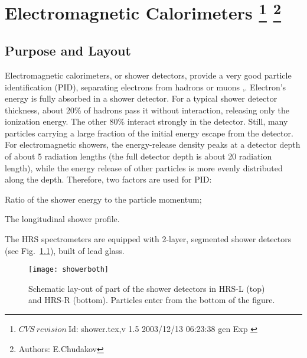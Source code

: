 \chapter[Electromagnetic Calorimeters]{Electromagnetic Calorimeters
\footnote{
  $CVS~revision~ $Id: shower.tex,v 1.5 2003/12/13 06:23:38 gen Exp $ $
}
\footnote{Authors: E.Chudakov }
}

\section{Purpose and Layout}

Electromagnetic calorimeters, or shower detectors, provide a very good
particle identification (PID), separating electrons from hadrons or
muons \cite{Bartoszek:1991ex},\cite{Appel:1975tt}.  Electron's energy
is fully absorbed in a shower detector.  For a typical shower detector
thickness, about 20\% of hadrons pass it without interaction,
releasing only the ionization energy.  The other 80\% interact
strongly in the detector. Still, many particles carrying a large
fraction of the initial energy escape from the detector. For
electromagnetic showers, the energy-release density peaks at a
detector depth of about 5 radiation lengths (the full detector depth
is about 20 radiation length), while the energy release of other
particles is more evenly distributed along the depth.  Therefore, two
factors are used for PID:
\begin{list}{.~}{\setlength{\itemsep}{-0.15cm}}
  \item Ratio of the shower energy to the particle momentum;
  \item The longitudinal shower profile.
\end{list}

The HRS spectrometers are equipped with 2-layer, segmented shower
detectors (see Fig.~\ref{fig:hrs-det-shower_layout}), built of
lead glass.
\begin{figure}[htb]
\begin{center}
   \texttt{[image: showerboth]}
\end{center}
\caption[Schematic lay-out of part of the shower detectors in HRS]%
{Schematic lay-out of part of the shower detectors in HRS-L
(top) and HRS-R (bottom). Particles enter from the bottom of the figure.}
\label{fig:hrs-det-shower_layout}
\end{figure}
  
